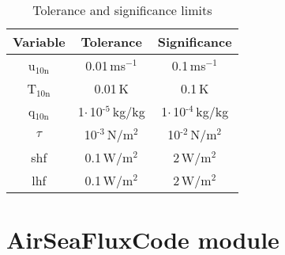 \documentclass[letterpaper,10pt,english]{sphinxmanual}
\begin{document}
\begin{table}[h]
    \caption{Tolerance and significance limits}
    \centering
        \begin{tabular}{|c|c|c|}
        \hline
        \textbf{Variable}   & \textbf{Tolerance}                           & \textbf{Significance}               \\ \hline
        u$_{\text{10n}}$   &   0.01\,ms$^{-1}$                           &   0.1\,ms$^{-1}$                      \\ \hline
        T$_{\text{10n}}$   &   0.01\,K                                         &   0.1\,K                                    \\ \hline
        q$_{\text{10n}}$   &   1$\cdot$\,10$^{\text{-5}}$\,kg/kg  &   1$\cdot$\,10$^{\text{-4}}$\,kg/kg \\ \hline
        \textrm{$\tau$}     &   10$^{\text{-3}}$\,N/m$^{2}$          &   10$^{\text{-2}}$\,N/m$^{2}$   \\ \hline
        shf                        &   0.1\,W/m$^{2}$                            &   2\,W/m$^{2}$                         \\ \hline
        lhf                         &   0.1\,W/m$^{2}$                            &   2\,W/m$^{2}$                          \\ \hline
        \end{tabular}
    \label{tab:tol}
\end{table}


%

\newpage
\section{AirSeaFluxCode module}
\label{\detokenize{index:AirSeaFluxCode-module}}
\label{\detokenize{index:module-AirSeaFluxCode}}
\end{document}
